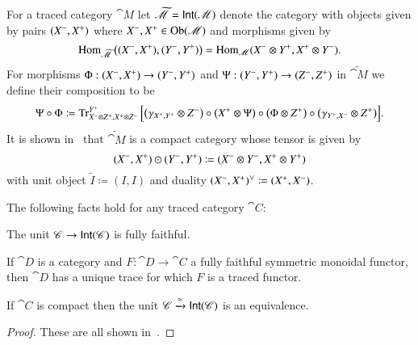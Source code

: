 \documentclass[12pt,oneside,article,draft]{memoir}
\begin{document}
For a traced category $\cat{M}$ let $\widetilde{\mathscr{M}}=\mathsf{Int}(\mathscr{M})$ denote the category with objects given by pairs $(X^-,X^+)$ where $X^-,X^+\in \operatorname{Ob}(\mathscr{M})$ and morphisms given by 
\[
	\operatorname{Hom}_{\widetilde{\mathscr{M}}}\big((X^-,X^+),(Y^-,Y^+)\big)=\operatorname{Hom}_{\mathscr{M}}(X^-\otimes Y^+,X^+\otimes Y^-).
\]
For morphisms $\Phi:(X^-,X^+)\to(Y^-,Y^+)$ and $\Psi:(Y^-,Y^+)\to(Z^-,Z^+)$ in $\widetilde{\cat{M}}$ we define their composition to be
\[
	\Psi\circ\Phi\coloneqq\operatorname{Tr}^{Y^+}_{X^-\otimes Z^+,X^+\otimes Z^-}\Big[\big(\gamma_{X^+,Y^+}\otimes Z^-\big)\circ\big(X^+\otimes\Psi\big)\circ\big(\Phi\otimes Z^+\big)\circ\big(\gamma_{Y^+,X^-}\otimes Z^+\big)\Big].
\]
It is shown in~\cite{JoyalStreetVerity} that $\widetilde{\cat{M}}$ is a compact category whose tensor is given by
\[
	(X^-,X^+)\odot(Y^-,Y^+)\coloneqq(X^-\otimes Y^-,X^+\otimes Y^+)
\]
with unit object $\tilde I\coloneqq(I,I)$ and duality $(X^-,X^+)^\vee\coloneqq(X^+,X^-)$.  


%
%
%

\begin{lemma}\label{lemma:fully faithful and trace}
The following facts hold for any traced category $\cat{C}$:
\begin{compactitem}
	\item The unit $\mathscr{C}\to\mathsf{Int}(\mathscr{C})$ is fully faithful.
	\item If $\cat{D}$ is a category and $F\colon\cat{D}\to\cat{C}$ a fully faithful symmetric monoidal functor, then $\cat{D}$ has a unique trace for which $F$ is a traced functor.
	\item If $\cat{C}$ is compact then the unit $\mathscr{C}\xrightarrow{\simeq}\mathsf{Int}(\mathscr{C})$ is an equivalence.
\end{compactitem}
\end{lemma}
\begin{proof}
	These are all shown in~\cite{JoyalStreetVerity}.
\end{proof}
\end{document}

